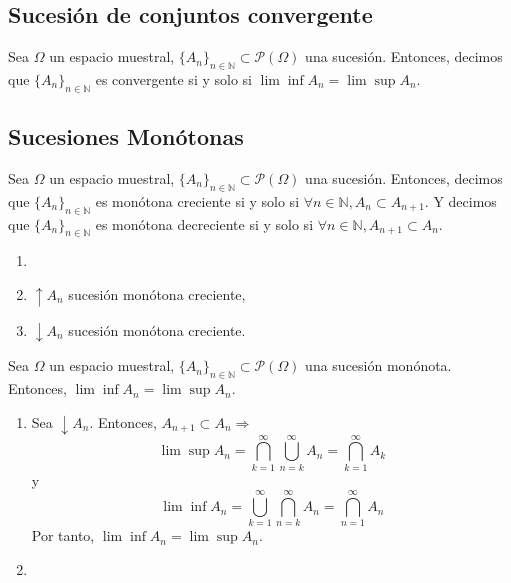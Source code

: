 \subsection{Sucesión de conjuntos convergente}

\begin{defn}[Covergencia]
  Sea $\Omega$ un espacio muestral, $\{ A_{n} \}_{n \in \mathbb{N}} \subset \mathcal{P}(\Omega)$ una sucesión. Entonces, decimos que $\{ A_{n} \}_{n \in \mathbb{N}}$ es convergente si y solo si $\lim \inf A_{n} = \lim \sup A_n$.
\end{defn}

\subsection{Sucesiones Monótonas}

\begin{defn}
  Sea $\Omega$ un espacio muestral, $\{ A_{n} \}_{n \in \mathbb{N}} \subset \mathcal{P}(\Omega)$ una sucesión. Entonces, decimos que $\{ A_{n} \}_{n \in \mathbb{N}}$ es monótona creciente si y solo si $\forall n \in \mathbb{N}, A_{n} \subset A_{n+1}$. Y decimos que $\{ A_{n} \}_{n \in \mathbb{N}}$ es monótona decreciente si y solo si $\forall n \in \mathbb{N}, A_{n+1} \subset A_{n}$.
\end{defn}

\begin{nota}
  \begin{enumerate}[label=(\roman*)]
    \item []
    \item $\uparrow A_{n}$ sucesión monótona creciente,
    \item $\downarrow A_{n}$ sucesión monótona creciente.
  \end{enumerate}
\end{nota}

\begin{prop}
Sea $\Omega$ un espacio muestral, $\{ A_{n} \}_{n \in \mathbb{N}} \subset \mathcal{P}(\Omega)$ una sucesión monónota. Entonces, $\lim \inf A_{n} = \lim \sup A_n$.
\end{prop}

\begin{dem}
  \begin{enumerate}[label=(\roman*)]
    \item Sea $\downarrow A_{n}$. Entonces, $A_{n+1} \subset A_{n} \Rightarrow$
      \[
         \lim \sup A_n = \bigcap_{k=1}^{\infty} \bigcup_{n=k}^{\infty} A_{n} = \bigcap_{k = 1}^{\infty} A_{k}
      \]
      y
      \[
        \lim \inf A_n = \bigcup_{k=1}^{\infty} \bigcap_{n=k}^{\infty} A_{n} = \bigcap_{n = 1}^{\infty} A_{n}
      \]
      Por tanto, $\lim \inf A_n  = \lim \sup A_n$.
    \item 
  \end{enumerate}
\end{dem}
